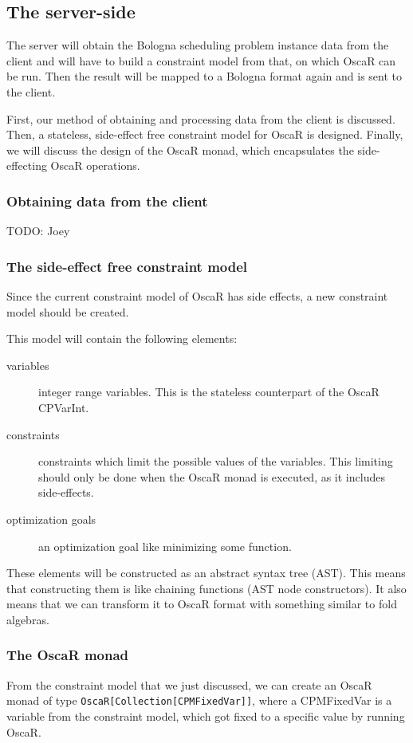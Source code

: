 \documentclass[a4paper]{article}
\begin{document}
\subsection{The server-side}
\label{sec:design-server}
The server will obtain the Bologna scheduling problem instance data from the client
and will have to build a constraint model from that, on which OscaR can be run.
Then the result will be mapped to a Bologna format again and is sent to the client.

First, our method of obtaining and processing data from the client is discussed.
Then, a stateless, side-effect free constraint model for OscaR is designed.
Finally, we will discuss the design of the OscaR monad, 
which encapsulates the side-effecting OscaR operations.

\subsubsection{Obtaining data from the client}
{\Large TODO:} Joey
\subsubsection{The side-effect free constraint model}
Since the current constraint model of OscaR has side effects,
a new constraint model should be created.

This model will contain the following elements:
\begin{description}
	\item[variables] integer range variables.
	This is the stateless counterpart of the OscaR CPVarInt.
	\item[constraints] constraints which limit the possible values of the variables.
	This limiting should only be done when the OscaR monad is executed,
	as it includes side-effects.
	\item[optimization goals] an optimization goal like minimizing some function.
\end{description}
These elements will be constructed as an abstract syntax tree (AST).
This means that constructing them is like chaining functions (AST node constructors). 
It also means that we can transform it to OscaR format with something similar to fold algebras.

\subsubsection{The OscaR monad}
From the constraint model that we just discussed, we can create an OscaR monad of type 
\verb|OscaR[Collection[CPMFixedVar]]|, 
where a CPMFixedVar is a variable from the constraint model, 
which got fixed to a specific value by running OscaR.
\end{document}
